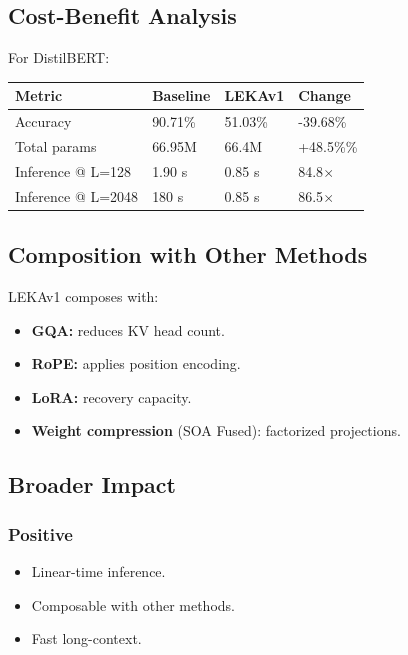 \subsection{Cost-Benefit Analysis}

For DistilBERT:

\begin{table}[H]
\centering
\small
\begin{tabular}{llll}
\toprule
\textbf{Metric} & \textbf{Baseline} & \textbf{LEKAv1} & \textbf{Change} \\
\midrule
Accuracy & 90.71\% & 51.03\% & -39.68\% \\
Total params & 66.95M & 66.4M & +48.5\%\% \\
Inference @ L=128 & 1.90 s & 0.85 s & 84.8$\times$ \\
Inference @ L=2048 & 180 s & 0.85 s & 86.5$\times$ \\
\bottomrule
\end{tabular}
\end{table}

\subsection{Composition with Other Methods}

LEKAv1 composes with:

\begin{itemize}
\item \textbf{GQA:} reduces KV head count.
\item \textbf{RoPE:} applies position encoding.
\item \textbf{LoRA:} recovery capacity.
\item \textbf{Weight compression} (SOA Fused): factorized projections.

\end{itemize}
\subsection{Broader Impact}

\subsubsection{Positive}
\begin{itemize}
\item Linear-time inference.
\item Composable with other methods.
\item Fast long-context.

\end{itemize}
